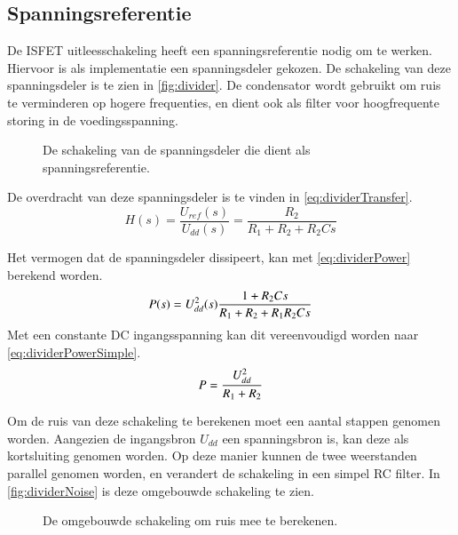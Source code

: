 \subsection{Spanningsreferentie}\label{sec:referenceVoltage}

De ISFET uitleesschakeling heeft een spanningsreferentie nodig om te werken.
Hiervoor is als implementatie een spanningsdeler gekozen. De schakeling van deze spanningsdeler is te zien in \autoref{fig:divider}.
De condensator wordt gebruikt om ruis te verminderen op hogere frequenties, en dient ook als filter voor hoogfrequente storing in de voedingsspanning.

\begin{figure}[ht]
    \centering
    \def\svgwidth{0.5\textwidth}
    
    \caption{De schakeling van de spanningsdeler die dient als spanningsreferentie.}
    \label{fig:divider}
\end{figure}

\noindent
De overdracht van deze spanningsdeler is te vinden in \autoref{eq:dividerTransfer}.
\begin{equation}\label{eq:dividerTransfer}
    H(s) = \frac{U_{ref}(s)}{U_{dd}(s)} = \frac{R_2}{R_1 + R_2 + R_2Cs}
\end{equation}

\noindent
Het vermogen dat de spanningsdeler dissipeert, kan met \autoref{eq:dividerPower} berekend worden.
\begin{equation}\label{eq:dividerPower}
    P(s) = U_{dd}^2(s)\frac{1+R_2Cs}{R_1 + R_2 + R_1R_2Cs}
    \tagaddtext{[\si{\watt}]}
\end{equation}
Met een constante DC ingangsspanning kan dit vereenvoudigd worden naar \autoref{eq:dividerPowerSimple}.
\begin{equation}\label{eq:dividerPowerSimple}
    P = \frac{U_{dd}^2}{R_1 + R_2}
    \tagaddtext{[\si{\watt}]}
\end{equation}

Om de ruis van deze schakeling te berekenen moet een aantal stappen genomen worden. Aangezien de ingangsbron $U_{dd}$ een spanningsbron is, kan deze als kortsluiting genomen worden. Op deze manier kunnen de twee weerstanden parallel genomen worden, en verandert de schakeling in een simpel RC filter. In \autoref{fig:dividerNoise} is deze omgebouwde schakeling te zien.

\begin{figure}[ht]
    \centering
    \def\svgwidth{0.35\textwidth}
    
    \caption{De omgebouwde schakeling om ruis mee te berekenen.}
    \label{fig:dividerNoise}
\end{figure}

